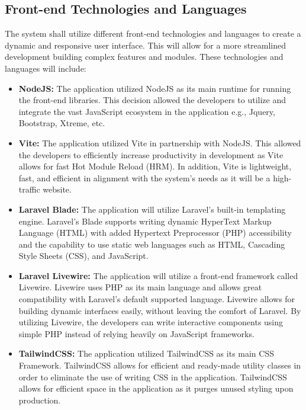 \subsection{Front-end Technologies and Languages}
    The system shall utilize different front-end technologies and languages to create a dynamic and responsive user interface. This will allow for a more streamlined development building complex features and modules. These technologies and languages will include:
    
    \begin{itemize}
        \item[] \textbf{NodeJS:} The application utilized NodeJS as its main runtime for running the front-end libraries. This decision allowed the developers to utilize and integrate the vast JavaScript ecosystem in the application e.g., Jquery, Bootstrap, Xtreme, etc.
        \item[] \textbf{Vite:} The application utilized Vite in partnership with NodeJS. This allowed the developers to efficiently increase productivity in development as Vite allows for fast Hot Module Reload (HRM). In addition, Vite is lightweight, fast, and efficient in alignment with the system's needs as it will be a high-traffic website.
        \item[] \textbf{Laravel Blade:} The application will utilize Laravel's built-in templating engine. Laravel's Blade supports writing dynamic HyperText Markup Language (HTML) with added Hypertext Preprocessor (PHP) accessibility and the capability to use static web languages such as HTML, Cascading Style Sheets (CSS), and JavaScript.
        \item[] \textbf{Laravel Livewire:} The application will utilize a front-end framework called Livewire. Livewire uses PHP as its main language and allows great compatibility with Laravel's default supported language. Livewire allows for building dynamic interfaces easily, without leaving the comfort of Laravel. By utilizing Livewire, the developers can write interactive components using simple PHP instead of relying heavily on JavaScript frameworks.
        \item[] \textbf{TailwindCSS:} The application utilized TailwindCSS as its main CSS Framework. TailwindCSS allows for efficient and ready-made utility classes in order to eliminate the use of writing CSS in the application. TailwindCSS allows for efficient space in the application as it purges unused styling upon production.
    \end{itemize}

